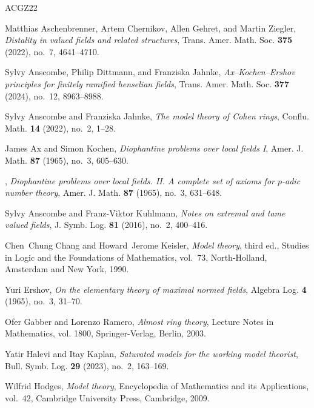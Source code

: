 \documentclass[a4paper]{amsart}
\theoremstyle{mystyle2}
\theoremstyle{mystyle}
\numberwithin{equation}{section}
\begin{document}
	\begin{thebibliography}{ACGZ22}
		
		Matthias Aschenbrenner, Artem Chernikov, Allen Gehret, and Martin Ziegler,
		\emph{Distality in valued fields and related structures}, Trans. Amer. Math.
		Soc. \textbf{375} (2022), no.~7, 4641--4710.
		
		Sylvy Anscombe, Philip Dittmann, and Franziska Jahnke,
		\emph{{A}x--{K}ochen--{E}rshov principles for finitely ramified henselian
			fields}, Trans. Amer. Math. Soc. \textbf{377} (2024), no.~12, 8963--8988.
		
		Sylvy Anscombe and Franziska Jahnke, \emph{The model theory of {C}ohen rings},
		Conflu. Math. \textbf{14} (2022), no.~2, 1--28.
		
		James Ax and Simon Kochen, \emph{Diophantine problems over local fields {I}},
		Amer. J. Math. \textbf{87} (1965), no.~3, 605--630.
		
		\bysame, \emph{Diophantine problems over local fields. {II}. {A} complete set
			of axioms for {$p$}-adic number theory}, Amer. J. Math. \textbf{87} (1965),
		no.~3, 631--648.
		
		Sylvy Anscombe and Franz-Viktor Kuhlmann, \emph{Notes on extremal and tame
			valued fields}, J. Symb. Log. \textbf{81} (2016), no.~2, 400--416.
		
		Chen~Chung Chang and Howard~Jerome Keisler, \emph{Model theory}, third ed.,
		Studies in Logic and the Foundations of Mathematics, vol.~73, North-Holland,
		Amsterdam and New York, 1990.
		
		Yuri Ershov, \emph{On the elementary theory of maximal normed fields}, Algebra
		Log. \textbf{4} (1965), no.~3, 31--70.
		
		Ofer Gabber and Lorenzo Ramero, \emph{Almost ring theory}, Lecture Notes in
		Mathematics, vol. 1800, Springer-Verlag, Berlin, 2003.
		
		Yatir Halevi and Itay Kaplan, \emph{Saturated models for the working model
			theorist}, Bull. Symb. Log. \textbf{29} (2023), no.~2, 163--169.
		
		Wilfrid Hodges, \emph{Model theory}, Encyclopedia of Mathematics and its
		Applications, vol.~42, Cambridge University Press, Cambridge, 2009.
		

\end{thebibliography}
\end{document}
